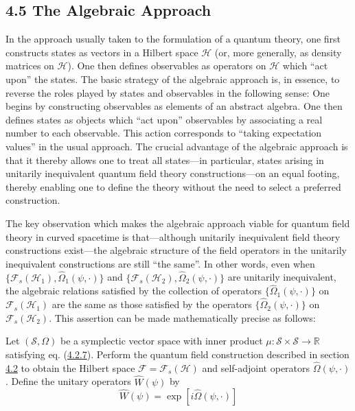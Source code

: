 \documentclass[11pt,a4paper]{article}
\begin{document}
\hypertarget{source-86}{}
\subsection*{4.5 The Algebraic Approach}\hypertarget{sec:4.5}{}

In the approach usually taken to the formulation of a quantum theory, one first constructs states as vectors in a Hilbert space \(\mathcal{H}\) (or, more generally, as density matrices on \(\mathcal{H}\)). One then defines observables as operators on \(\mathcal{H}\) which ``act upon'' the states. The basic strategy of the algebraic approach is, in essence, to reverse the roles played by states and observables in the following sense: One begins by constructing observables as elements of an abstract algebra. One then defines states as objects which ``act upon'' observables by associating a real number to each observable. This action corresponds to ``taking expectation values'' in the usual approach. The crucial advantage of the algebraic approach is that it thereby allows one to treat all states---in particular, states arising in unitarily inequivalent quantum field theory constructions---on an equal footing, thereby enabling one to define the theory without the need to select a preferred construction.

The key observation which makes the algebraic approach viable for quantum field theory in curved spacetime is that---although unitarily inequivalent field theory constructions exist---the algebraic structure of the field operators in the unitarily inequivalent constructions are still ``the same''. In other words, even when \(\{\mathcal{F}_s(\mathcal{H}_1), \widehat{\Omega}_1(\psi,\cdot)\}\) and \(\{\mathcal{F}_s(\mathcal{H}_2), \widehat{\Omega}_2(\psi,\cdot)\}\) are unitarily inequivalent, the algebraic relations satisfied by the collection of operators \(\{\widehat{\Omega}_1(\psi,\cdot)\}\) on \(\mathcal{F}_s(\mathcal{H}_1)\) are the same as those satisfied by the operators \(\{\widehat{\Omega}_2(\psi,\cdot)\}\) on \(\mathcal{F}_s(\mathcal{H}_2)\). This assertion can be made mathematically precise as follows:

Let \((\mathcal{S}, \Omega)\) be a symplectic vector space with inner product \(\mu: \mathcal{S} \times \mathcal{S} \to \mathbb{R}\) satisfying eq. (\hyperref[eq:4.2.7]{4.2.7}). Perform the quantum field construction described in section \hyperlink{sec:4.2}{4.2} to obtain the Hilbert space \(\mathcal{F} = \mathcal{F}_s(\mathcal{H})\) and self-adjoint operators \(\widehat{\Omega}(\psi, \cdot)\). Define the unitary operators \(\widehat{W}(\psi)\) by
\begin{equation*}
\widehat{W}(\psi) = \exp[i\widehat{\Omega}(\psi, \cdot)] \tag{4.5.1}\label{eq:4.5.1}
\end{equation*}
\end{document}
